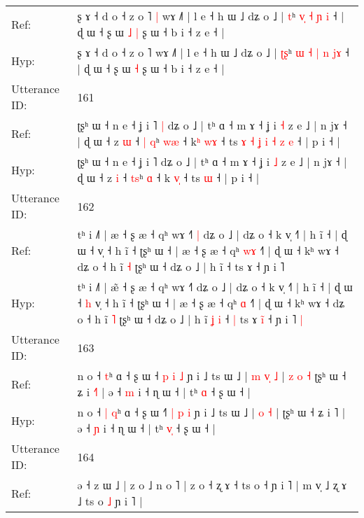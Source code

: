 \documentclass[10pt]{article}
\DeclareRobustCommand{\hl}[1]{{\textcolor{red}{#1}}}
\begin{document}
\begin{longtable}{ll}
Ref: & ʂ ɤ ˧ d o ˧ z o ˥\hl{ }\hl{|} wɤ ˩˥ | l e ˧ h ɯ ˩ dʑ o ˩ | \hl{}\hl{t}ʰ \hl{}\hl{v}\hl{̩} \hl{˧} \hl{ɲ} \hl{}\hl{i} ˧ | ɖ ɯ ˧ ʂ ɯ\hl{ }\hl{˩} \hl{|} ʂ ɯ ˧ b i ˧ z e ˧ |
 \\
Hyp: & ʂ ɤ ˧ d o ˧ z o ˥\hl{}\hl{} wɤ ˩˥ | l e ˧ h ɯ ˩ dʑ o ˩ | \hl{ʈ}\hl{ʂ}ʰ \hl{ɯ}\hl{ }\hl{˧} \hl{|} \hl{n} \hl{j}\hl{ɤ} ˧ | ɖ ɯ ˧ ʂ ɯ\hl{}\hl{} \hl{˧} ʂ ɯ ˧ b i ˧ z e ˧ |
 \\
\midrule
Utterance ID: & 161 \\
Ref: & ʈʂʰ ɯ ˧ n e ˧ ʝ i ˥\hl{ }\hl{|} dʑ o ˩ | tʰ ɑ ˧ m ɤ ˧ ʝ i \hl{˧} z e ˩ | n jɤ ˧ | ɖ ɯ ˧ z \hl{ɯ} ˧ \hl{|}\hl{ }\hl{q}ʰ \hl{w}\hl{æ} ˧ k\hl{ʰ} \hl{w}\hl{ɤ} ˧ ts\hl{ }\hl{ɤ}\hl{ }\hl{˧}\hl{ }\hl{ʝ}\hl{ }\hl{i}\hl{ }\hl{˧}\hl{ }\hl{z} \hl{e} ˧ | p i ˧ |
 \\
Hyp: & ʈʂʰ ɯ ˧ n e ˧ ʝ i ˥\hl{}\hl{} dʑ o ˩ | tʰ ɑ ˧ m ɤ ˧ ʝ i \hl{˩} z e ˩ | n jɤ ˧ | ɖ ɯ ˧ z \hl{i} ˧ \hl{}\hl{t}\hl{s}ʰ \hl{}\hl{ɑ} ˧ k\hl{} \hl{v}\hl{̩} ˧ ts\hl{}\hl{}\hl{}\hl{}\hl{}\hl{}\hl{}\hl{}\hl{}\hl{}\hl{}\hl{} \hl{ɯ} ˧ | p i ˧ |
 \\
\midrule
Utterance ID: & 162 \\
Ref: & tʰ i ˩˥ | æ\hl{} ˧ ʂ æ ˧ qʰ wɤ ˧˥\hl{ }\hl{|} dʑ o ˩ | dʑ o ˧ k v̩ ˧˥ | h ĩ ˧ | ɖ ɯ ˧\hl{}\hl{} v̩ ˧ h ĩ ˧ ʈʂʰ ɯ ˧ | æ ˧ ʂ æ ˧ qʰ \hl{w}\hl{ɤ} ˧˥ | ɖ ɯ ˧ kʰ wɤ ˧ dʑ o ˧ h ĩ \hl{˧} ʈʂʰ ɯ ˧ dʑ o ˩ | h ĩ\hl{}\hl{}\hl{}\hl{} ˧\hl{}\hl{} ts ɤ\hl{}\hl{}\hl{} ˧ ɲ i ˥\hl{}\hl{}
 \\
Hyp: & tʰ i ˩˥ | æ\hl{̃} ˧ ʂ æ ˧ qʰ wɤ ˧˥\hl{}\hl{} dʑ o ˩ | dʑ o ˧ k v̩ ˧˥ | h ĩ ˧ | ɖ ɯ ˧\hl{ }\hl{h} v̩ ˧ h ĩ ˧ ʈʂʰ ɯ ˧ | æ ˧ ʂ æ ˧ qʰ \hl{}\hl{ɑ} ˧˥ | ɖ ɯ ˧ kʰ wɤ ˧ dʑ o ˧ h ĩ \hl{˥} ʈʂʰ ɯ ˧ dʑ o ˩ | h ĩ\hl{ }\hl{ʝ}\hl{ }\hl{i} ˧\hl{ }\hl{|} ts ɤ\hl{ }\hl{i}\hl{̃} ˧ ɲ i ˥\hl{ }\hl{|}
 \\
\midrule
Utterance ID: & 163 \\
Ref: & n o ˧\hl{}\hl{} \hl{t}ʰ ɑ ˧ ʂ ɯ ˧\hl{} \hl{p} \hl{i} \hl{˩} ɲ i ˩ ts ɯ ˩ |\hl{ }\hl{m} \hl{v}\hl{̩} \hl{˩} |\hl{ }\hl{z}\hl{ }\hl{o}\hl{ }\hl{˧} ʈʂʰ ɯ ˧ ʑ i \hl{˧}˥ | ə ˧ \hl{m} i ˧ ɳ ɯ ˧ | tʰ \hl{}\hl{ɑ} ˧ ʂ ɯ ˧ |
 \\
Hyp: & n o ˧\hl{ }\hl{|} \hl{q}ʰ ɑ ˧ ʂ ɯ ˧\hl{˥} \hl{|} \hl{p} \hl{i} ɲ i ˩ ts ɯ ˩ |\hl{}\hl{} \hl{}\hl{o} \hl{˧} |\hl{}\hl{}\hl{}\hl{}\hl{}\hl{} ʈʂʰ ɯ ˧ ʑ i \hl{}˥ | ə ˧ \hl{ɲ} i ˧ ɳ ɯ ˧ | tʰ \hl{v}\hl{̩} ˧ ʂ ɯ ˧ |
 \\
\midrule
Utterance ID: & 164 \\
Ref: & ə ˧ z ɯ ˩ | z o ˩ n o ˥ | z o ˧ ʐ ɤ ˧ ts o ˧ ɲ i ˥ | m v̩ ˩ ʐ ɤ ˩ ts o \hl{˩} ɲ i ˥ |
 \\

\end{longtable}
\end{document}
